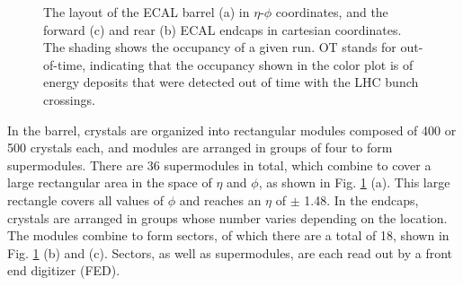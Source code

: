 \begin{figure}[tb!]
\caption{The layout of the ECAL barrel (a) in $\eta$-$\phi$ coordinates, and the forward (c) and rear (b) ECAL endcaps in cartesian coordinates. The shading shows the occupancy of a given run. OT stands for out-of-time, indicating that the occupancy shown in the color plot is of energy deposits that were detected out of time with the LHC bunch crossings.} 
\label{fig:EcalLayout}
\end{figure}

In the barrel, crystals are organized into rectangular modules composed of 400 or 500 crystals each, and modules are arranged in groups of four to form supermodules. There are 36 supermodules in total, which combine to cover a large rectangular area in the space of $\eta$ and $\phi$, as shown in Fig. \ref{fig:EcalLayout} (a). This large rectangle covers all values of $\phi$ and reaches an $\eta$ of $\pm$ 1.48. In the endcaps, crystals are arranged in groups whose number varies depending on the location. The modules combine to form sectors, of which there are a total of 18, shown in Fig. \ref{fig:EcalLayout} (b) and (c). Sectors, as well as supermodules, are each read out by a front end digitizer (FED).

